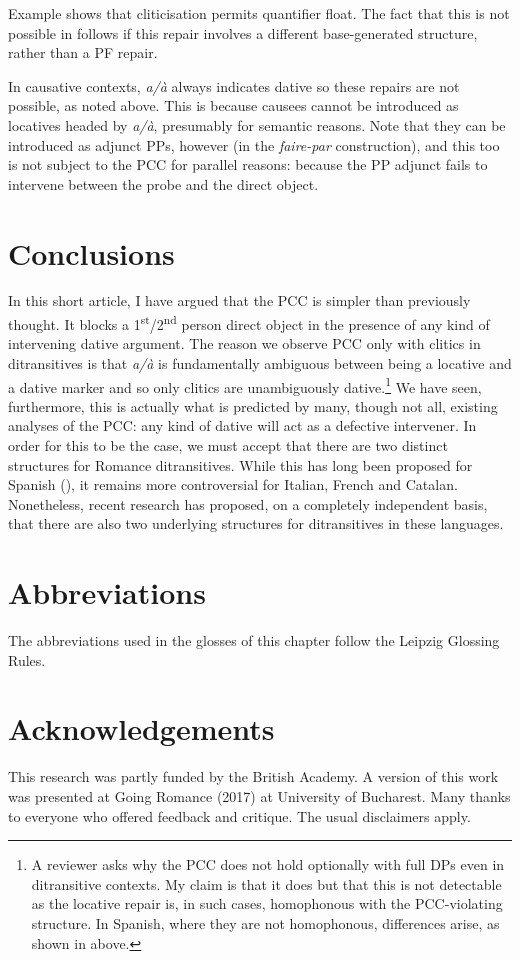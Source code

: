 \documentclass[output=paper,colorlinks,citecolor=brown,nonflat]{langsci/langscibook}
\begin{document}
Example  shows that cliticisation permits quantifier float. The fact that this is not possible in  follows if this repair involves a different base-gen\-er\-ated structure, rather than a PF repair.

In causative contexts, \textit{a/à} always indicates dative so these repairs are not possible, as noted above. This is because causees cannot be introduced as locatives headed by \textit{a/à}, presumably for semantic reasons. Note that they can be introduced as adjunct PPs, however (in the \textit{faire-par} construction), and this too is not subject to the PCC for parallel reasons: because the PP adjunct fails to intervene between the probe and the direct object.

\section{Conclusions}\label{sec:sheehan:6}

In this short article, I have argued that the PCC is simpler than previously thought. It blocks a 1\textsuperscript{st}/2\textsuperscript{nd} person direct object in the presence of any kind of intervening dative argument. The reason we observe PCC only with clitics in ditransitives is that \textit{a/à} is fundamentally ambiguous between being a locative and a dative marker and so only clitics are unambiguously dative.\footnote{A reviewer asks why the PCC does not hold optionally with full DPs even in ditransitive contexts. My claim is that it does but that this is not detectable as the locative repair is, in such cases, homophonous with the PCC-violating structure. In Spanish, where they are not homophonous, differences arise, as shown in  above.} We have seen, furthermore, this is actually what is predicted by many, though not all, existing analyses of the PCC: any kind of dative will act as a defective intervener. In order for this to be the case, we must accept that there are two distinct structures for Romance ditransitives. While this has long been proposed for Spanish (\citealt{Demonte1995, Cuervo2003}), it remains more controversial for Italian, French and Catalan. Nonetheless, recent research has proposed, on a completely independent basis, that there are also two underlying structures for ditransitives in these languages.

\section*{Abbreviations}
The abbreviations used in the glosses of this chapter follow the Leipzig Glossing Rules.

\section*{Acknowledgements}

This research was partly funded by the British Academy. A version of this work was presented at Going Romance (2017) at University of Bucharest. Many thanks to everyone who offered feedback and critique. The usual disclaimers apply.

\sloppy\printbibliography[heading=subbibliography,notkeyword=this]
\end{document}
